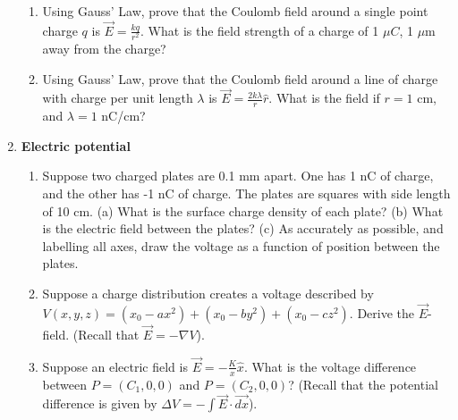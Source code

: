 \documentclass[10pt]{article}
\begin{document}
\begin{enumerate}
\begin{enumerate}
\item Using Gauss' Law, prove that the Coulomb field around a single point charge $q$ is $\vec{E} = \frac{k q}{r^2}$.  What is the field strength of a charge of 1 $\mu C$, 1 $\mu$m away from the charge? \\ \vspace{3cm}
\item Using Gauss' Law, prove that the Coulomb field around a line of charge with charge per unit length $\lambda$ is $\vec{E} = \frac{2k\lambda}{r} \hat{r}$.  What is the field if $r = 1$ cm, and $\lambda = 1$ nC/cm? \\ \vspace{3cm}
\end{enumerate}
\item \textbf{Electric potential}
\begin{enumerate}
\item Suppose two charged plates are 0.1 mm apart.  One has 1 nC of charge, and the other has -1 nC of charge.  The plates are squares with side length of 10 cm.  (a) What is the surface charge density of each plate?  (b) What is the electric field between the plates?  (c) As accurately as possible, and labelling all axes, draw the voltage as a function of position between the plates. \\ \vspace{4cm}
\item Suppose a charge distribution creates a voltage described by $V(x,y,z) = (x_0 - a x^2) + (x_0 - b y^2) + (x_0 - c z^2)$.  Derive the $\vec{E}$-field.  (Recall that $\vec{E} = -\nabla V$).\\ \vspace{3cm}
\item Suppose an electric field is $\vec{E} = -\frac{K}{x} \hat{x}$.  What is the voltage difference between $P = (C_1,0,0)$ and $P = (C_2,0,0)$? (Recall that the potential difference is given by $\Delta V = - \int \vec{E} \cdot \vec{dx}$).
\end{enumerate}
\end{enumerate}
\end{document}

